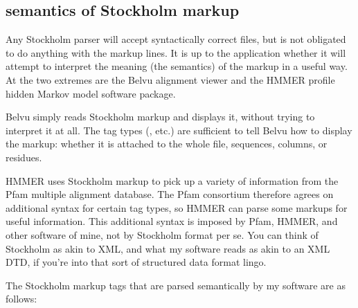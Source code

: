 \subsection{semantics of Stockholm markup}

Any Stockholm parser will accept syntactically correct files, but is
not obligated to do anything with the markup lines. It is up to the
application whether it will attempt to interpret the meaning (the
semantics) of the markup in a useful way. At the two extremes are the
Belvu alignment viewer and the HMMER profile hidden Markov model
software package.

Belvu simply reads Stockholm markup and displays it, without trying to
interpret it at all. The tag types (, etc.) are sufficient
to tell Belvu how to display the markup: whether it is attached to the
whole file, sequences, columns, or residues.

HMMER uses Stockholm markup to pick up a variety of information from
the Pfam multiple alignment database. The Pfam consortium therefore
agrees on additional syntax for certain tag types, so HMMER can parse
some markups for useful information. This additional syntax is imposed
by Pfam, HMMER, and other software of mine, not by Stockholm format
per se. You can think of Stockholm as akin to XML, and what my
software reads as akin to an XML DTD, if you're into that sort of
structured data format lingo.

The Stockholm markup tags that are parsed semantically by my software
are as follows:

